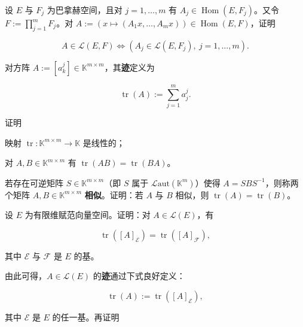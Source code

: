\begin{exercises}
\item

设 $ E $ 与 $ F_j $ 为巴拿赫空间，且对 $ j = 1, \ldots, m $ 有 $ A_j \in \operatorname{Hom}(E, F_j) $。又令 $ F := \prod_{j=1}^{m} F_j $。对 $ A := (x \mapsto (A_1x, \ldots, A_mx)) \in \operatorname{Hom}(E, F) $，证明

\[
A \in \mathcal{L}(E, F) \iff (A_j \in \mathcal{L}(E, F_j), \ j = 1, \ldots, m) .
\]
\item

对方阵 $ A := [a_{k}^{j}] \in \mathbb{K}^{m \times m} $，其\textbf{迹}定义为

\[
\operatorname{tr}(A) := \sum_{j=1}^{m} a_{j}^{j} .
\]

证明

\begin{subitems}
\item

映射 $ \operatorname{tr} : \mathbb{K}^{m \times m} \to \mathbb{K} $ 是线性的；

\item

对 $ A, B \in \mathbb{K}^{m \times m} $ 有 $ \operatorname{tr}(AB) = \operatorname{tr}(BA) $。

\end{subitems}

\item

若存在可逆矩阵 $ S \in \mathbb{K}^{m \times m} $（即 $ S $ 属于 $ \mathcal{L}\mathrm{aut}(\mathbb{K}^{m}) $）使得 $ A = SBS^{-1} $，则称两个矩阵 $ A, B \in \mathbb{K}^{m \times m} $ \textbf{相似}。证明：若 $ A $ 与 $ B $ 相似，则 $ \operatorname{tr}(A) = \operatorname{tr}(B) $。

\item

设 $ E $ 为有限维赋范向量空间。证明：对 $ A \in \mathcal{L}(E) $，有

\[
\operatorname{tr}([A]_{\mathcal{E}}) = \operatorname{tr}([A]_{\mathcal{F}}) ,
\]

其中 $ \mathcal{E} $ 与 $ \mathcal{F} $ 是 $ E $ 的基。

由此可得，$ A \in \mathcal{L}(E) $ 的\textbf{迹}通过下式良好定义：

\[
\operatorname{tr}(A) := \operatorname{tr}([A]_{\mathcal{E}}) ,
\]

其中 $ \mathcal{E} $ 是 $ E $ 的任一基。再证明

\begin{subitems}
\item


\end{subitems}
\end{exercises}
